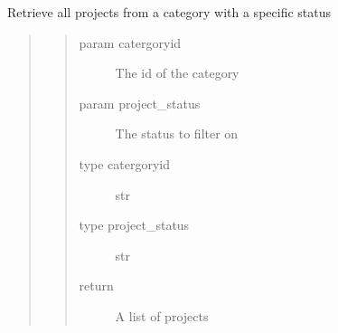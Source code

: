 \documentclass[letterpaper,10pt,english]{sphinxmanual}
\begin{document}

\begin{fulllineitems}
\label{\detokenize{index:models.project.get_projects_by_status_and_category}}
Retrieve all projects from a category with a specific status
\begin{quote}
\begin{quote}\begin{description}
\item[{param catergoryid}] \leavevmode
The id of the category

\item[{param project\_status}] \leavevmode
The status to filter on

\item[{type catergoryid}] \leavevmode
str

\item[{type project\_status}] \leavevmode
str

\item[{return}] \leavevmode
A list of projects

\end{description}\end{quote}
\end{quote}

\end{fulllineitems}

\end{document}
